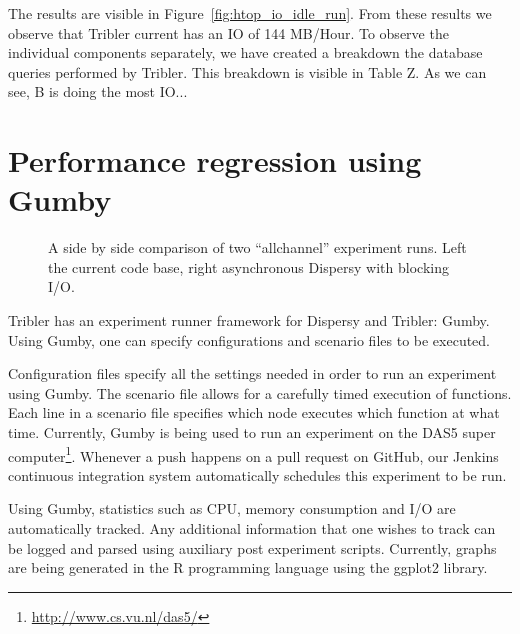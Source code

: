 The results are visible in Figure~\ref{fig:htop_io_idle_run}. 
From these results we observe that Tribler current has an IO of 144 MB/Hour.
To observe the individual components separately, we have created a breakdown the database queries performed by Tribler.
This breakdown is visible in Table Z.
As we can see, B is doing the most IO... 

\section{Performance regression using Gumby}

\begin{figure}[h]
	\caption{A side by side comparison of two \enquote{allchannel} experiment runs. Left the current code base, right asynchronous Dispersy with blocking I/O.}
	\label{fig:side_by_side_send}
\end{figure} 

Tribler has an experiment runner framework for Dispersy and Tribler: Gumby.
Using Gumby, one can specify configurations and scenario files to be executed.

Configuration files specify all the settings needed in order to run an experiment using Gumby.
The scenario file allows for a carefully timed execution of functions.
Each line in a scenario file specifies which node executes which function at what time. 
Currently, Gumby is being used to run an experiment on the DAS5 super computer\footnote{\url{http://www.cs.vu.nl/das5/}}.
Whenever a push happens on a pull request on GitHub, our Jenkins continuous integration system automatically schedules this experiment to be run.

Using Gumby, statistics such as CPU, memory consumption and I/O are automatically tracked.
Any additional information that one wishes to track can be logged and parsed using auxiliary post experiment scripts.
Currently, graphs are being generated in the R programming language using the ggplot2 library.


